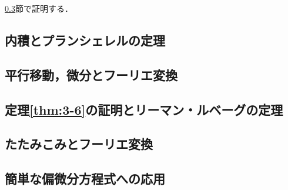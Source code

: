 \documentclass[dvipdfmx,a4j,10pt]{jsarticle}
\makeatletter
\theoremstyle{mystyle1}
\theoremstyle{mystyle3}
\theoremstyle{mystyle4}
\theoremstyle{mystyle6}
\theoremstyle{mystyle2}
\theoremstyle{mystyle5}
\renewenvironment{proof}[1][\proofname]{\par
  \pushQED{\qed}%
  \normalfont
  \topsep6\p@\@plus6\p@ \trivlist
  \item[\hskip\labelsep{\bfseries\sffamily #1}]\ignorespaces
}{%
  \popQED\endtrivlist\@endpefalse
}
\renewcommand\proofname{証明}
\makeatother
\begin{document}
\begin{proof}
	\ref{sec:3-7}節で証明する．
\end{proof}

\subsection{内積とプランシェレルの定理}

\subsection{平行移動，微分とフーリエ変換}

\subsection{定理\ref{thm:3-6}の証明とリーマン・ルベーグの定理}\label{sec:3-7}

\subsection{たたみこみとフーリエ変換}

\subsection{簡単な偏微分方程式への応用}
\end{document}
